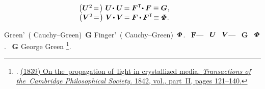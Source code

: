 \nopagebreak\vspace{-0.1em}\begin{equation}\label{deformationtensors.nonlinear}
\begin{array}{c}
\hspace*{-2.33em} \bigl( \hspace{.1ex} \bm{U}^{\hspace{.1ex}2} \hspace{-0.3ex} = \hspace{.22ex} \bigr) \hspace{.8ex}
\bm{U} \hspace{-0.3ex} \dotp \hspace{.1ex} \bm{U} \hspace{-0.2ex}
= \bm{F}^{\hspace{.1ex}\T} \hspace{-0.4ex} \dotp \bm{F}
\equiv \bm{G}
\hspace{.1ex} ,
\\[.1em]
%
\hspace*{-2.33em} \bigl( \hspace{.1ex} \bm{V}^{\hspace{.04ex}2} \hspace{-0.3ex} = \hspace{.22ex} \bigr) \hspace{.8ex}
\bm{V} \hspace{-0.3ex} \dotp \bm{V} \hspace{-0.25ex}
= \bm{F} \dotp \bm{F}^{\hspace{.1ex}\T} \hspace{-0.36ex}
\equiv \mathboldPhi
\hspace{.1ex} .
\end{array}
\end{equation}

\vspace{-0.25em}\noindent
{} Green’~(  Cauchy--Green)~$\bm{G}$  Finger’~(  Cauchy--Green)~$\mathboldPhi$.
 ~$\bm{F}$\:---    ~${\bm{U}\hspace{-0.25ex}}$ ~${\bm{V}\hspace{-0.25ex}}$\:---   ~$\bm{G}$ ~$\mathboldPhi$.
~$\bm{G}$  George Green\hspace{-0.1ex}%
\footnote{%
\href{https://en.wikipedia.org/wiki/George_Green_(mathematician)}{}. \href{https://hdl.handle.net/2027/mdp.39015027059651?urlappend=\%3Bseq=133}{(1839) On the~propagation of~light in crystallized media. \emph{Transactions of the~Cambridge Philosophical Society.} 1842, vol., part~II, pages 121\hbox{--}140.}
}\hspace{-0.5ex}.

